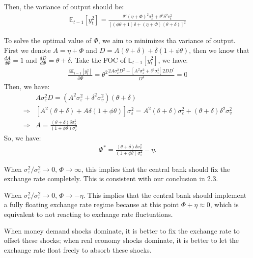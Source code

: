 \documentclass[a4paper,12pt]{article} %
\theoremstyle{nonitalic}
\begin{document}
Then, the variance of output should be:
\begin{gather*}
    \mathbb{E}_{t-1} [y_t^2] = \frac{\theta^2 (\eta + \Phi)^2 \sigma_{\varepsilon}^2 + \theta^2 \delta^2 v_t^2}{\left[ (\phi \theta + 1)\delta + (\eta + \Phi) (\theta + \delta) \right]^2}
\end{gather*}

To solve the optimal value of $\Phi$, we aim to minimizes tha variance of output.
First we denote $A = \eta + \Phi$ and $D = A(\theta +\delta) + \delta (1 + \phi \theta)$,
then we know that $\frac{d A}{d \Phi} = 1$ and $\frac{d D}{d \Phi} = \theta + \delta$.
Take the FOC of $\mathbb{E}_{t-1}[y_t^2]$, we have:
\begin{gather*}
    \frac{\partial \mathbb{E}_{t-1}[y_t^2]}{\partial \Phi} = \theta^2 \frac{2A \sigma_{\varepsilon}^2 D^2 - \left[A^2 \sigma_{\varepsilon}^2 + \delta^2 \sigma_v^2\right] 2D D^{\prime}}{D^4}  = 0
\end{gather*}
Then, we have:
\begin{align*}
    & A \sigma_{\varepsilon}^2 D = \left( A^2 \sigma_{\varepsilon}^2 + \delta^2 \sigma_v^2 \right)(\theta + \delta) \\
    \Rightarrow & \left[ A^2(\theta + \delta) + A \delta (1 + \phi \theta) \right] \sigma_{\varepsilon}^2 = A^2 (\theta + \delta) \sigma_{\varepsilon}^2 + (\theta + \delta) \delta ^2 \sigma _v^2 \\
    \Rightarrow & A = \frac{(\theta + \delta) \delta \sigma_v^2}{(1 + \phi \theta) \sigma_{\varepsilon}^2}
\end{align*}
So, we have:
\begin{gather*}
    \Phi^* = \frac{(\theta + \delta) \delta \sigma_v^2}{(1 + \phi \theta) \sigma_{\varepsilon}^2} - \eta.
\end{gather*}

When $\sigma_\varepsilon^2/\sigma_v^2 \to 0$, $\Phi \to \infty$, 
this implies that the central bank should fix the exchange rate completely. 
This is consistent with our conclusion in 2.3.

When $\sigma_v^2/\sigma_\varepsilon^2 \to 0$, $\Phi \to -\eta$. 
This implies that the central bank should implement a fully floating exchange rate regime 
because at this point $\Phi + \eta \approx 0$, which is equivalent to not reacting to exchange rate fluctuations.

When money demand shocks dominate, 
it is better to fix the exchange rate to offset these shocks; 
when real economy shocks dominate, it is better to let the exchange rate float freely to absorb these shocks.
\end{document}

